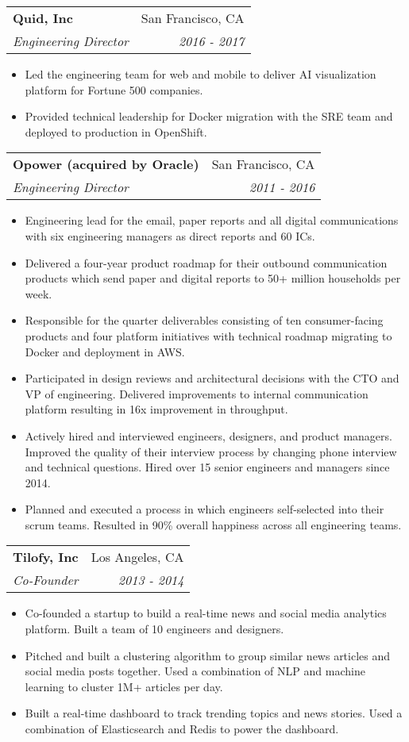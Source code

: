 \documentclass[letterpaper,11pt]{article}
\makeatletter
\newcommand{\resumeSubheading}[4]{
  \vspace{-1pt}\item
    \begin{tabular*}{0.97\textwidth}[t]{l@{\extracolsep{\fill}}r}
      \textbf{#1} & #2 \\
      \textit{\small#3} & \textit{\small #4} \\
    \end{tabular*}\vspace{-5pt}
}
\newcommand{\resumeItemListStart}{\begin{itemize}}
\newcommand{\resumeItemListEnd}{\end{itemize}\vspace{-5pt}}
\makeatother
\begin{document}
    \pagebreak[3]

    \resumeSubheading
    {Quid, Inc}{San Francisco, CA}
    {Engineering Director}{2016 - 2017}
    \resumeItemListStart
      \item Led the engineering team for web and mobile to deliver AI visualization platform for Fortune 500 companies.
      \item Provided technical leadership for Docker migration with the SRE team and deployed to production in OpenShift.
    \resumeItemListEnd

    \pagebreak[3]

    \resumeSubheading
    {Opower (acquired by Oracle)}{San Francisco, CA}
    {Engineering Director}{2011 - 2016}
    \resumeItemListStart
      \item Engineering lead for the email, paper reports and all digital communications with six engineering managers as direct reports and 60 ICs.
      \item Delivered a four-year product roadmap for their outbound communication products which send paper and digital reports to 50+ million households per week.
      \item Responsible for the quarter deliverables consisting of ten consumer-facing products and four platform initiatives with technical roadmap migrating to Docker and deployment in AWS.
      \item Participated in design reviews and architectural decisions with the CTO and VP of engineering. Delivered improvements to internal communication platform resulting in 16x improvement in throughput.
      \item Actively hired and interviewed engineers, designers, and product managers. Improved the quality of their interview process by changing phone interview and technical questions. Hired over 15 senior engineers and managers since 2014.
      \item Planned and executed a process in which engineers self-selected into their scrum teams. Resulted in 90\% overall happiness across all engineering teams.
    \resumeItemListEnd

    \resumeSubheading
    {Tilofy, Inc}{Los Angeles, CA}
    {Co-Founder}{2013 - 2014}
  \resumeItemListStart
    \item Co-founded a startup to build a real-time news and social media analytics platform. Built a team of 10 engineers and designers.
    \item Pitched and built a clustering algorithm to group similar news articles and social media posts together. Used a combination of NLP and machine learning to cluster 1M+ articles per day.
    \item Built a real-time dashboard to track trending topics and news stories. Used a combination of Elasticsearch and Redis to power the dashboard.
  \resumeItemListEnd
\end{document}
